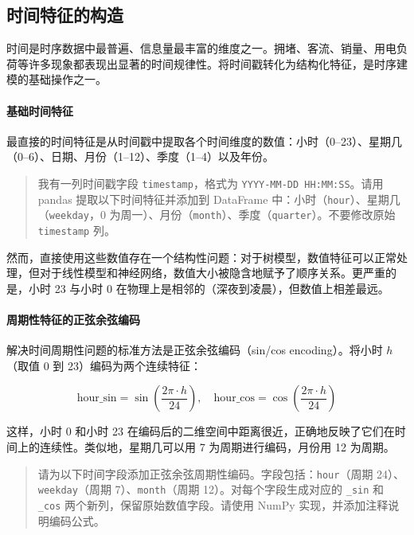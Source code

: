 \subsection{时间特征的构造}

时间是时序数据中最普遍、信息量最丰富的维度之一。拥堵、客流、销量、用电负荷等许多现象都表现出显著的时间规律性。将时间戳转化为结构化特征，是时序建模的基础操作之一。

\paragraph{基础时间特征}

最直接的时间特征是从时间戳中提取各个时间维度的数值：小时（0--23）、星期几（0--6）、日期、月份（1--12）、季度（1--4）以及年份。

\begin{quote}
我有一列时间戳字段 \texttt{timestamp}，格式为 \texttt{YYYY-MM-DD HH:MM:SS}。请用 pandas 提取以下时间特征并添加到 DataFrame 中：小时（\texttt{hour}）、星期几（\texttt{weekday}，0 为周一）、月份（\texttt{month}）、季度（\texttt{quarter}）。不要修改原始 \texttt{timestamp} 列。
\end{quote}

然而，直接使用这些数值存在一个结构性问题：对于树模型，数值特征可以正常处理，但对于线性模型和神经网络，数值大小被隐含地赋予了顺序关系。更严重的是，小时 23 与小时 0 在物理上是相邻的（深夜到凌晨），但数值上相差最远。

\paragraph{周期性特征的正弦余弦编码}

解决时间周期性问题的标准方法是正弦余弦编码（sin/cos encoding）。将小时 $h$（取值 0 到 23）编码为两个连续特征：

\[
  \text{hour\_sin} = \sin\!\left(\frac{2\pi \cdot h}{24}\right), \quad
  \text{hour\_cos} = \cos\!\left(\frac{2\pi \cdot h}{24}\right)
\]

这样，小时 0 和小时 23 在编码后的二维空间中距离很近，正确地反映了它们在时间上的连续性。类似地，星期几可以用 7 为周期进行编码，月份用 12 为周期。

\begin{quote}
请为以下时间字段添加正弦余弦周期性编码。字段包括：\texttt{hour}（周期 24）、\texttt{weekday}（周期 7）、\texttt{month}（周期 12）。对每个字段生成对应的 \texttt{\_sin} 和 \texttt{\_cos} 两个新列，保留原始数值字段。请使用 NumPy 实现，并添加注释说明编码公式。
\end{quote}

